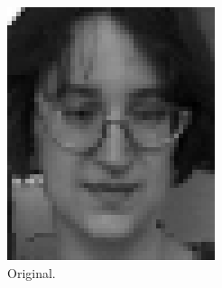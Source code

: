 \documentclass[a4paper, 10pt, conference]{ieeeconf}
\begin{document}
\begin{figure}[!ht]
	\captionsetup[subfigure]{position=b}
        \centering
        \begin{subfigure}{0.1\textwidth}
        \includegraphics[width=\textwidth]{src/face1.png}
                \caption{Original.}
        \end{subfigure}
        ~
        \begin{subfigure}{0.1\textwidth}

\end{subfigure}
\end{figure}
\end{document}
